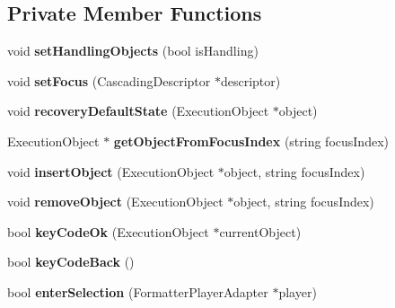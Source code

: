 \subsection*{Private Member Functions}
\begin{CompactItemize}
\item 
void \textbf{setHandlingObjects} (bool isHandling)\label{classbr_1_1pucrio_1_1telemidia_1_1ginga_1_1ncl_1_1focus_1_1FormatterFocusManager_1afb7cbfbb19c626bd50aaf083336d80}

\item 
void \textbf{setFocus} (CascadingDescriptor $\ast$descriptor)\label{classbr_1_1pucrio_1_1telemidia_1_1ginga_1_1ncl_1_1focus_1_1FormatterFocusManager_aac580e6cc15414bfc6d3c52e93c6e53}

\item 
void \textbf{recoveryDefaultState} (ExecutionObject $\ast$object)\label{classbr_1_1pucrio_1_1telemidia_1_1ginga_1_1ncl_1_1focus_1_1FormatterFocusManager_cfb643b840d7f36b3a5dbbff55da0224}

\item 
ExecutionObject $\ast$ \textbf{getObjectFromFocusIndex} (string focusIndex)\label{classbr_1_1pucrio_1_1telemidia_1_1ginga_1_1ncl_1_1focus_1_1FormatterFocusManager_925d7fc00eca486ce0496919b8344016}

\item 
void \textbf{insertObject} (ExecutionObject $\ast$object, string focusIndex)\label{classbr_1_1pucrio_1_1telemidia_1_1ginga_1_1ncl_1_1focus_1_1FormatterFocusManager_b5676093b3a731a3a75707a467295189}

\item 
void \textbf{removeObject} (ExecutionObject $\ast$object, string focusIndex)\label{classbr_1_1pucrio_1_1telemidia_1_1ginga_1_1ncl_1_1focus_1_1FormatterFocusManager_47d33ef1bdbdccc9a7c88efa467cd860}

\item 
bool \textbf{keyCodeOk} (ExecutionObject $\ast$currentObject)\label{classbr_1_1pucrio_1_1telemidia_1_1ginga_1_1ncl_1_1focus_1_1FormatterFocusManager_cf0ca61890d0f375da5de2a9f615e24f}

\item 
bool \textbf{keyCodeBack} ()\label{classbr_1_1pucrio_1_1telemidia_1_1ginga_1_1ncl_1_1focus_1_1FormatterFocusManager_db660a0219e3984a61776d928cfed1dc}

\item 
bool \textbf{enterSelection} (FormatterPlayerAdapter $\ast$player)\label{classbr_1_1pucrio_1_1telemidia_1_1ginga_1_1ncl_1_1focus_1_1FormatterFocusManager_e5bf5177d1da4605fe3d7ceed38c87c5}


\end{CompactItemize}
